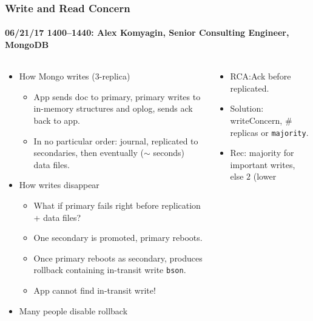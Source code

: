 \documentclass[xcolor=dvipsnames, 9pt]{beamer}
\begin{document}
\begin{frame}
    \frametitle{Write and Read Concern}
    \framesubtitle{%
        06/21/17 1400--1440:
        Alex Komyagin, Senior Consulting Engineer, MongoDB
    }
    \begin{columns}
        \begin{column}{0.5\textwidth}
            \begin{itemize}
                \item How Mongo writes (3-replica)
                    \begin{itemize}
                        \item App sends doc to primary, primary writes to
                            in-memory structures and oplog, sends ack back to
                            app.
                        \item In no particular order: journal, replicated to
                            secondaries, then eventually ($\sim$ seconds) data
                            files.
                    \end{itemize}
                \item How writes disappear
                    \begin{itemize}
                        \item What if primary fails right before replication +
                            data files?
                        \item One secondary is promoted, primary reboots.
                        \item Once primary reboots as secondary, produces
                            rollback containing in-transit write \texttt{bson}.
                        \item App cannot find in-transit write!
                    \end{itemize}
                \item Many people disable rollback \frownie\frownie\frownie
            \end{itemize}
        \end{column}
        \begin{column}{0.5\textwidth}
            \begin{itemize}
                \item RCA:\@ Ack before replicated.
                \item Solution: writeConcern, \# replicas or \texttt{majority}.
                \item Rec: majority for important writes, else $2$ (lower

\end{itemize}
\end{column}
\end{columns}
\end{frame}
\end{document}
